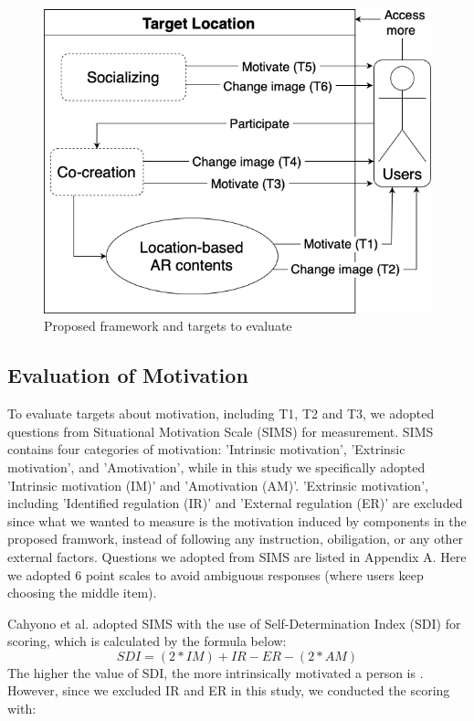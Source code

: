 \begin{figure}[ht]
  \centering
  \includegraphics[width=0.8\columnwidth]{resources/5_experiment_and_results/proposed_framework_with_validate_targets.png}
    \caption{Proposed framework and targets to evaluate}
\end{figure}

\subsection{Evaluation of Motivation}

To evaluate targets about motivation, including T1, T2 and T3, we adopted questions from Situational Motivation Scale (SIMS) \cite{guay_vallerand_blanchard_2000} for measurement.
SIMS contains four categories of motivation: 'Intrinsic motivation', 'Extrinsic motivation', and 'Amotivation', while in this study we specifically adopted 'Intrinsic motivation (IM)' and 'Amotivation (AM)'.
'Extrinsic motivation', including 'Identified regulation (IR)' and 'External regulation (ER)' are excluded since what we wanted to measure is the motivation induced by components in the proposed framwork, instead of following any instruction, obiligation, or any other external factors.
Questions we adopted from SIMS are listed in Appendix A.
Here we adopted 6 point scales to avoid ambiguous responses (where users keep choosing the middle item).

Cahyono et al. adopted SIMS with the use of Self-Determination Index (SDI) for scoring, which is calculated by the formula below:
\[ SDI = (2 * IM) + IR - ER - (2 * AM) \]
The higher the value of SDI, the more intrinsically motivated a person is \cite{cahyono_ludwig_2017}.
However, since we excluded IR and ER in this study, we conducted the scoring with:

